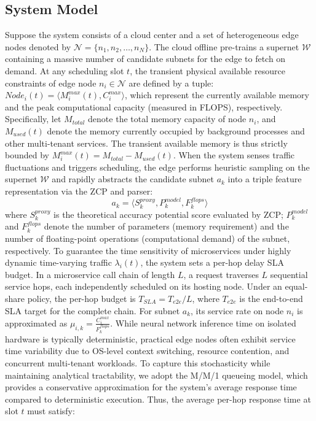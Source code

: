 \documentclass[conference]{IEEEtran}
\begin{document}
\subsection{System Model}
Suppose the system consists of a cloud center and a set of heterogeneous edge nodes denoted by $\mathcal{N} = \{n_1, n_2, \dots, n_N\}$. The cloud offline pre-trains a supernet $\mathcal{W}$ containing a massive number of candidate subnets for the edge to fetch on demand. At any scheduling slot $t$, the transient physical available resource constraints of edge node $n_i \in \mathcal{N}$ are defined by a tuple: $Node_i(t) = \langle M_i^{max}(t), C_i^{max} \rangle$, which represent the currently available memory and the peak computational capacity (measured in FLOPS), respectively. Specifically, let $M_{total}$ denote the total memory capacity of node $n_i$, and $M_{used}(t)$ denote the memory currently occupied by background processes and other multi-tenant services. The transient available memory is thus strictly bounded by $M_{i}^{max}(t) = M_{total} - M_{used}(t)$. When the system senses traffic fluctuations and triggers scheduling, the edge performs heuristic sampling on the supernet $\mathcal{W}$ and rapidly abstracts the candidate subnet $a_k$ into a triple feature representation via the ZCP and parser:
\begin{equation}
a_k = \langle S_k^{proxy}, P_k^{model}, F_k^{flops} \rangle
\label{eq:arch_tuple}
\end{equation}
where $S_k^{proxy}$ is the theoretical accuracy potential score evaluated by ZCP; $P_k^{model}$ and $F_k^{flops}$ denote the number of parameters (memory requirement) and the number of floating-point operations (computational demand) of the subnet, respectively. To guarantee the time sensitivity of microservices under highly dynamic time-varying traffic $\lambda_i(t)$, the system sets a per-hop delay SLA budget. In a microservice call chain of length $L$, a request traverses $L$ sequential service hops, each independently scheduled on its hosting node. Under an equal-share policy, the per-hop budget is $T_{SLA} = T_{e2e}/L$, where $T_{e2e}$ is the end-to-end SLA target for the complete chain. For subnet $a_{k}$, its service rate on node $n_{i}$ is approximated as $\mu_{i,k}=\frac{C_{i}^{max}}{F_{k}^{flops}}$. While neural network inference time on isolated hardware is typically deterministic, practical edge nodes often exhibit service time variability due to OS-level context switching, resource contention, and concurrent multi-tenant workloads. To capture this stochasticity while maintaining analytical tractability, we adopt the M/M/1 queueing model, which provides a conservative approximation for the system's average response time compared to deterministic execution. Thus, the average per-hop response time at slot $t$ must satisfy:
\end{document}
